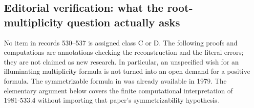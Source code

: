 \subsection{Editorial verification: what the root-multiplicity question actually asks}

No item in records 530--537 is assigned class C or D. The following proofs and computations are annotations checking the reconstruction and the literal errors; they are not claimed as new research. In particular, an unspecified wish for an illuminating multiplicity formula is not turned into an open demand for a positive formula. The symmetrizable formula in \citet[Theorem 2]{bermanmoody1979multiplicities} was already available in 1979. The elementary argument below covers the finite computational interpretation of 1981-533.4 without importing that paper's symmetrizability hypothesis.

